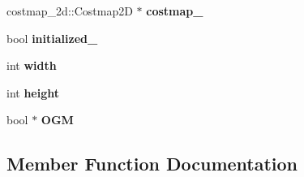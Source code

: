 \begin{DoxyCompactItemize}
\item 
costmap\+\_\+2d\+::\+Costmap2D $\ast$ {\bfseries costmap\+\_\+}\hypertarget{class_r_astar__planner_1_1_r_astar_planner_r_o_s_a8e9d61f1082f16a9bedb7f038fa090ed}{}\label{class_r_astar__planner_1_1_r_astar_planner_r_o_s_a8e9d61f1082f16a9bedb7f038fa090ed}

\item 
bool {\bfseries initialized\+\_\+}\hypertarget{class_r_astar__planner_1_1_r_astar_planner_r_o_s_a01c6678d519c4f7667747ea21dccd8ba}{}\label{class_r_astar__planner_1_1_r_astar_planner_r_o_s_a01c6678d519c4f7667747ea21dccd8ba}

\item 
int {\bfseries width}\hypertarget{class_r_astar__planner_1_1_r_astar_planner_r_o_s_accbb5d01b9d9630eb906c71fb255dd0d}{}\label{class_r_astar__planner_1_1_r_astar_planner_r_o_s_accbb5d01b9d9630eb906c71fb255dd0d}

\item 
int {\bfseries height}\hypertarget{class_r_astar__planner_1_1_r_astar_planner_r_o_s_ab200f89722ca863dff4daf8ea25fd910}{}\label{class_r_astar__planner_1_1_r_astar_planner_r_o_s_ab200f89722ca863dff4daf8ea25fd910}

\item 
bool $\ast$ {\bfseries O\+GM}\hypertarget{class_r_astar__planner_1_1_r_astar_planner_r_o_s_a873e16d6355ad94a276f4795bb450141}{}\label{class_r_astar__planner_1_1_r_astar_planner_r_o_s_a873e16d6355ad94a276f4795bb450141}

\end{DoxyCompactItemize}


\subsection{Member Function Documentation}
